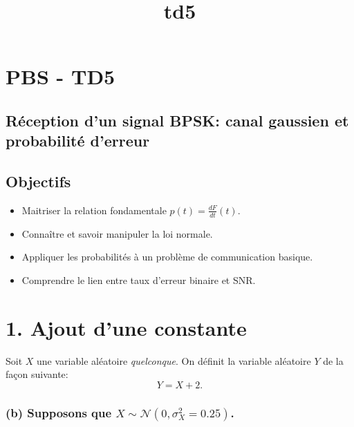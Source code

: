 \documentclass[11pt]{article}
\title{td5}
\providecommand{\tightlist}{%
      \setlength{\itemsep}{0pt}\setlength{\parskip}{0pt}}
\begin{document}
    
    \maketitle
    
    

    
    \hypertarget{pbs---td5}{%
\section{PBS - TD5}\label{pbs---td5}}

\hypertarget{ruxe9ception-dun-signal-bpsk-canal-gaussien-et-probabilituxe9-derreur}{%
\subsection{Réception d'un signal BPSK: canal gaussien et probabilité
d'erreur}\label{ruxe9ception-dun-signal-bpsk-canal-gaussien-et-probabilituxe9-derreur}}

    \hypertarget{objectifs}{%
\subsection{Objectifs}\label{objectifs}}

\begin{itemize}
\tightlist
\item
  Maitriser la relation fondamentale \(p(t) = \frac{dF}{dt}(t)\).
\item
  Connaître et savoir manipuler la loi normale.
\item
  Appliquer les probabilités à un problème de communication basique.
\item
  Comprendre le lien entre taux d'erreur binaire et SNR.
\end{itemize}

    \hypertarget{ajout-dune-constante}{%
\section{1. Ajout d'une constante}\label{ajout-dune-constante}}

Soit \(X\) une variable aléatoire \emph{quelconque}. On définit la
variable aléatoire \(Y\) de la façon suivante: \[Y = X+2.\]

    

    \hypertarget{b-supposons-que-xsimmathcaln0-sigma_x20.25.}{%
\subsubsection{\texorpdfstring{(b) Supposons que
\(X\sim\mathcal{N}(0, \sigma_{X}^2=0.25)\).}{(b) Supposons que X\textbackslash sim\textbackslash mathcal\{N\}(0, \textbackslash sigma\_\{X\}\^{}2=0.25).}}\label{b-supposons-que-xsimmathcaln0-sigma_x20.25.}}
\end{document}
